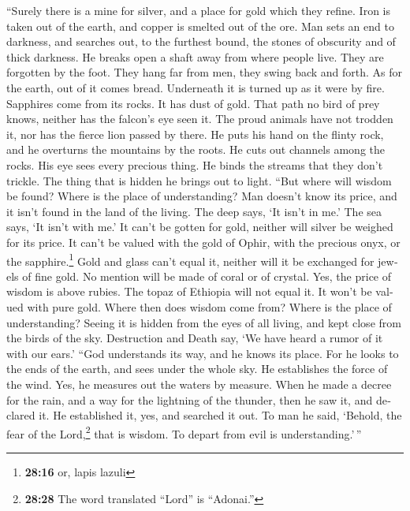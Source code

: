 \begin{paracol}{2}
\begin{otherlanguage}{english}
 ``Surely there is a mine for silver, and a place for gold
which they refine.  Iron is taken out of the earth, and
copper is smelted out of the ore.  Man sets an end to
darkness, and searches out, to the furthest bound, the stones of
obscurity and of thick darkness.  He breaks open a shaft
away from where people live. They are forgotten by the foot. They hang
far from men, they swing back and forth.  As for the
earth, out of it comes bread. Underneath it is turned up as it were by
fire.  Sapphires come from its rocks. It has dust of gold.
 That path no bird of prey knows, neither has the falcon's
eye seen it.  The proud animals have not trodden it, nor
has the fierce lion passed by there.  He puts his hand on
the flinty rock, and he overturns the mountains by the roots.
 He cuts out channels among the rocks. His eye sees every
precious thing.  He binds the streams that they don't
trickle. The thing that is hidden he brings out to light.
 ``But where will wisdom be found? Where is the place of
understanding?  Man doesn't know its price, and it isn't
found in the land of the living.  The deep says, `It
isn't in me.' The sea says, `It isn't with me.'  It can't
be gotten for gold, neither will silver be weighed for its price.
 It can't be valued with the gold of Ophir, with the
precious onyx, or the sapphire.\footnote{\textbf{28:16} or, lapis lazuli}
 Gold and glass can't equal it, neither will it be
exchanged for jewels of fine gold.  No mention will be
made of coral or of crystal. Yes, the price of wisdom is above rubies.
 The topaz of Ethiopia will not equal it. It won't be
valued with pure gold.  Where then does wisdom come from?
Where is the place of understanding?  Seeing it is hidden
from the eyes of all living, and kept close from the birds of the sky.
 Destruction and Death say, `We have heard a rumor of it
with our ears.'  ``God understands its way, and he knows
its place.  For he looks to the ends of the earth, and
sees under the whole sky.  He establishes the force of
the wind. Yes, he measures out the waters by measure. 
When he made a decree for the rain, and a way for the lightning of the
thunder,  then he saw it, and declared it. He established
it, yes, and searched it out.  To man he said, `Behold,
the fear of the Lord,\footnote{\textbf{28:28} The word translated
  ``Lord'' is ``Adonai.''} that is wisdom. To depart from evil is
understanding.'\,''


\end{otherlanguage}
\end{paracol}
